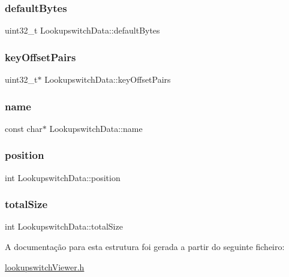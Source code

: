 \subsubsection{\texorpdfstring{default\+Bytes}{defaultBytes}}
{\footnotesize\ttfamily uint32\+\_\+t Lookupswitch\+Data\+::default\+Bytes}

\hypertarget{struct_lookupswitch_data_a47c2e5ea4d79b8f5fa1b92ab2280bb22}{}\label{struct_lookupswitch_data_a47c2e5ea4d79b8f5fa1b92ab2280bb22} 
\subsubsection{\texorpdfstring{key\+Offset\+Pairs}{keyOffsetPairs}}
{\footnotesize\ttfamily uint32\+\_\+t$\ast$ Lookupswitch\+Data\+::key\+Offset\+Pairs}

\hypertarget{struct_lookupswitch_data_aa7422f01abbe6a3c7274eb3814070ff2}{}\label{struct_lookupswitch_data_aa7422f01abbe6a3c7274eb3814070ff2} 
\subsubsection{\texorpdfstring{name}{name}}
{\footnotesize\ttfamily const char$\ast$ Lookupswitch\+Data\+::name}

\hypertarget{struct_lookupswitch_data_a5d0ee67c83b73f23e3f545bbd98b1aa6}{}\label{struct_lookupswitch_data_a5d0ee67c83b73f23e3f545bbd98b1aa6} 
\subsubsection{\texorpdfstring{position}{position}}
{\footnotesize\ttfamily int Lookupswitch\+Data\+::position}

\hypertarget{struct_lookupswitch_data_ac65eda1cf7fd0950f65f468dc78b4133}{}\label{struct_lookupswitch_data_ac65eda1cf7fd0950f65f468dc78b4133} 
\subsubsection{\texorpdfstring{total\+Size}{totalSize}}
{\footnotesize\ttfamily int Lookupswitch\+Data\+::total\+Size}



A documentação para esta estrutura foi gerada a partir do seguinte ficheiro\+:\begin{DoxyCompactItemize}
\item 
\hyperlink{lookupswitch_viewer_8h}{lookupswitch\+Viewer.\+h}\end{DoxyCompactItemize}
